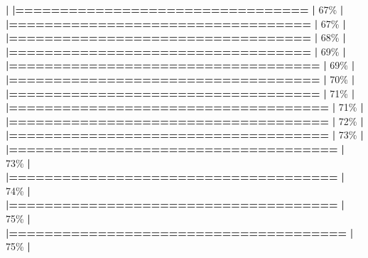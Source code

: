 \documentclass[
]{book}
\newenvironment{Shaded}{\begin{snugshade}}{\end{snugshade}}
\newcommand{\DecValTok}[1]{\textcolor[rgb]{0.00,0.00,0.81}{#1}}
\newcommand{\ErrorTok}[1]{\textcolor[rgb]{0.64,0.00,0.00}{\textbf{#1}}}
\newcommand{\NormalTok}[1]{#1}
\newcommand{\SpecialCharTok}[1]{\textcolor[rgb]{0.81,0.36,0.00}{\textbf{#1}}}
\begin{document}
\begin{Shaded}
\begin{Highlighting}[]
  \SpecialCharTok{|}                                                        
  \ErrorTok{|=================================}                 \ErrorTok{|}  \DecValTok{67}\NormalTok{\%}
  \SpecialCharTok{|}                                                        
  \ErrorTok{|==================================}                \ErrorTok{|}  \DecValTok{67}\NormalTok{\%}
  \SpecialCharTok{|}                                                        
  \ErrorTok{|==================================}                \ErrorTok{|}  \DecValTok{68}\NormalTok{\%}
  \SpecialCharTok{|}                                                        
  \ErrorTok{|==================================}                \ErrorTok{|}  \DecValTok{69}\NormalTok{\%}
  \SpecialCharTok{|}                                                        
  \ErrorTok{|===================================}               \ErrorTok{|}  \DecValTok{69}\NormalTok{\%}
  \SpecialCharTok{|}                                                        
  \ErrorTok{|===================================}               \ErrorTok{|}  \DecValTok{70}\NormalTok{\%}
  \SpecialCharTok{|}                                                        
  \ErrorTok{|===================================}               \ErrorTok{|}  \DecValTok{71}\NormalTok{\%}
  \SpecialCharTok{|}                                                        
  \ErrorTok{|====================================}              \ErrorTok{|}  \DecValTok{71}\NormalTok{\%}
  \SpecialCharTok{|}                                                        
  \ErrorTok{|====================================}              \ErrorTok{|}  \DecValTok{72}\NormalTok{\%}
  \SpecialCharTok{|}                                                        
  \ErrorTok{|====================================}              \ErrorTok{|}  \DecValTok{73}\NormalTok{\%}
  \SpecialCharTok{|}                                                        
  \ErrorTok{|=====================================}             \ErrorTok{|}  \DecValTok{73}\NormalTok{\%}
  \SpecialCharTok{|}                                                        
  \ErrorTok{|=====================================}             \ErrorTok{|}  \DecValTok{74}\NormalTok{\%}
  \SpecialCharTok{|}                                                        
  \ErrorTok{|=====================================}             \ErrorTok{|}  \DecValTok{75}\NormalTok{\%}
  \SpecialCharTok{|}                                                        
  \ErrorTok{|======================================}            \ErrorTok{|}  \DecValTok{75}\NormalTok{\%}
  \SpecialCharTok{|}                                                        

\end{Highlighting}
\end{Shaded}
\end{document}
